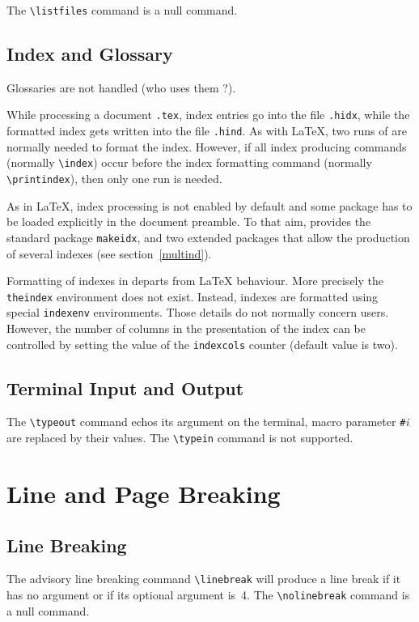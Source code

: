 The \verb+\listfiles+ command is a null command.


\subsection{Index and Glossary}\label{index}
Glossaries are not handled (who uses them ?).

While processing a document \texttt{.tex}, index
entries go into the file \texttt{.hidx}, while
the formatted index gets written into the file
\texttt{.hind}.
As with \LaTeX{}, two runs of \hevea{} are normally needed to format
the index.
However, if all index producing commands (normally \verb+\index+)
occur before the index formatting command (normally
\verb+\printindex+), then only one run is needed.

As in \LaTeX, index processing is not enabled by default and
some  package has to be loaded explicitly in the
document preamble.
To that aim, \hevea{} provides the standard package \texttt{makeidx},
and two extended packages that allow the production of several indexes
(see section~\ref{multind}).

Formatting of indexes in \hevea{} departs from \LaTeX{} behaviour.
More precisely the \verb+theindex+ environment does not exist.
Instead, indexes are formatted using special
\texttt{indexenv} environments.
Those details do not normally concern users.
However, the
number of columns in the presentation  of the index can be controlled
by setting the value of the \texttt{indexcols} counter (default value
is two).

\subsection{Terminal Input and Output}

The \verb+\typeout+ command echos its argument on the
terminal, macro parameter \verb+#+\textit{i} are replaced by their values.
The \verb+\typein+ command is not supported.

\section{Line and Page Breaking}

\subsection{Line Breaking}
The advisory line breaking command \verb+\linebreak+
will produce a line break if it has no argument or if its optional
argument is~4.
The \verb+\nolinebreak+ command is a null command.



